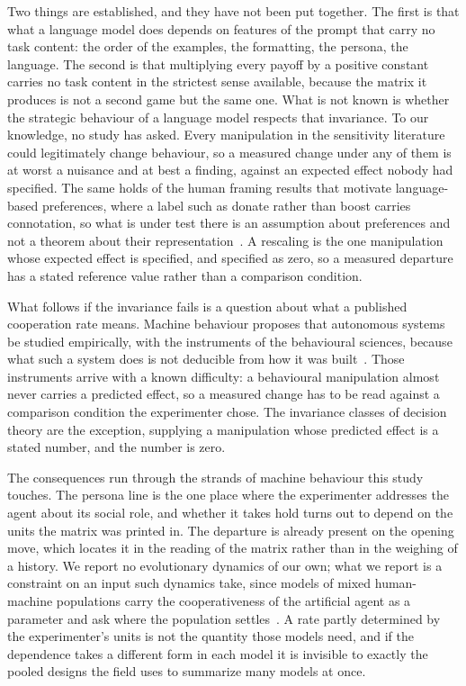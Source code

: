 \documentclass[11pt,a4paper]{article}
\begin{document}
Two things are established, and they have not been put together. The first is
that what a language model does depends on features of the prompt that carry
no task content: the order of the examples, the formatting, the persona, the
language. The second is that multiplying every payoff by a positive constant
carries no task content in the strictest sense available, because the matrix
it produces is not a second game but the same one. What is not known is
whether the strategic behaviour of a language model respects that invariance.
To our knowledge, no study has asked. Every manipulation in the sensitivity
literature could legitimately change behaviour, so a measured change under any
of them is at worst a nuisance and at best a finding, against an expected
effect nobody had specified. The same holds of the human framing results that
motivate language-based preferences, where a label such as donate rather than
boost carries connotation, so what is under test there is an assumption about
preferences and not a theorem about their
representation~\citep{capraro2024language}. A rescaling is the one manipulation
whose expected effect is specified, and specified as zero, so a measured
departure has a stated reference value rather than a comparison condition.

What follows if the invariance fails is a question about what a published
cooperation rate means. Machine behaviour proposes that autonomous systems be
studied empirically, with the instruments of the behavioural sciences, because
what such a system does is not deducible from how it was
built~\citep{rahwan2019machine}. Those instruments arrive with a known
difficulty: a behavioural manipulation almost never carries a predicted effect,
so a measured change has to be read against a comparison condition the
experimenter chose. The invariance classes of decision theory are the exception,
supplying a manipulation whose predicted effect is a stated number, and the
number is zero.

The consequences run through the strands of machine behaviour this study
touches. The persona line is the one place where the experimenter addresses the
agent about its social role, and whether it takes hold turns out to depend on
the units the matrix was printed in. The departure is already present on the
opening move, which locates it in the reading of the matrix rather than in the
weighing of a history. We report no evolutionary dynamics of our own; what we
report is a constraint on an input such dynamics take, since models of mixed
human-machine populations carry the cooperativeness of the artificial agent as a
parameter and ask where the population
settles~\citep{santos2018social,han2011intention,han2013good,perc2017statistical,paiva2018engineering}.
A rate partly determined by the experimenter's units is not the quantity those
models need, and if the dependence takes a different form in each model it is
invisible to exactly the pooled designs the field uses to summarize many models
at once.
\end{document}
